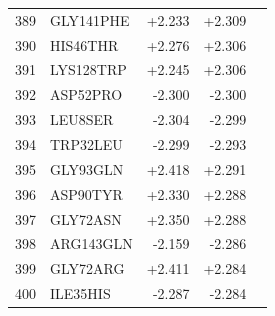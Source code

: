 \begin{longtable}{r l r r c}
389 & GLY141PHE & +2.233 & +2.309 &  \\
390 & HIS46THR & +2.276 & +2.306 &  \\
391 & LYS128TRP & +2.245 & +2.306 &  \\
392 & ASP52PRO & -2.300 & -2.300 &  \\
393 & LEU8SER & -2.304 & -2.299 &  \\
394 & TRP32LEU & -2.299 & -2.293 &  \\
395 & GLY93GLN & +2.418 & +2.291 &  \\
396 & ASP90TYR & +2.330 & +2.288 &  \\
397 & GLY72ASN & +2.350 & +2.288 &  \\
398 & ARG143GLN & -2.159 & -2.286 &  \\
399 & GLY72ARG & +2.411 & +2.284 &  \\
400 & ILE35HIS & -2.287 & -2.284 &  \\
\hline
\end{longtable}
